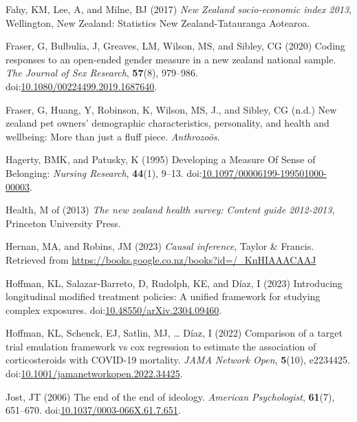 \documentclass[
  singlecolumn,
  9pt]{article}
\newlength{\cslhangindent}
\newenvironment{CSLReferences}[2] %
 {\begin{list}{}{%
  \setlength{\itemindent}{0pt}
  \setlength{\leftmargin}{0pt}
  \setlength{\parsep}{0pt}
  \ifodd #1
   \setlength{\leftmargin}{\cslhangindent}
   \setlength{\itemindent}{-1\cslhangindent}
  \fi
  \setlength{\itemsep}{#2\baselineskip}}}
 {\end{list}}
\begin{document}
\begin{CSLReferences}{1}{0}
Fahy, KM, Lee, A, and Milne, BJ (2017) \emph{New Zealand socio-economic
index 2013}, Wellington, New Zealand: Statistics New Zealand-Tatauranga
Aotearoa.

Fraser, G, Bulbulia, J, Greaves, LM, Wilson, MS, and Sibley, CG (2020)
Coding responses to an open-ended gender measure in a new zealand
national sample. \emph{The Journal of Sex Research}, \textbf{57}(8),
979--986.
doi:\href{https://doi.org/10.1080/00224499.2019.1687640}{10.1080/00224499.2019.1687640}.

Fraser, G, Huang, Y, Robinson, K, Wilson, MS, J., and Sibley, CG (n.d.)
New zealand pet owners{'} demographic characteristics, personality, and
health and wellbeing: More than just a fluff piece. \emph{Anthrozoös}.

Hagerty, BMK, and Patusky, K (1995) Developing a Measure Of Sense of
Belonging: \emph{Nursing Research}, \textbf{44}(1), 9--13.
doi:\href{https://doi.org/10.1097/00006199-199501000-00003}{10.1097/00006199-199501000-00003}.

Health, M of (2013) \emph{The new zealand health survey: Content guide
2012-2013}, Princeton University Press.

Hernan, MA, and Robins, JM (2023) \emph{Causal inference}, Taylor \&
Francis. Retrieved from
\url{https://books.google.co.nz/books?id=/_KnHIAAACAAJ}

Hoffman, KL, Salazar-Barreto, D, Rudolph, KE, and Díaz, I (2023)
Introducing longitudinal modified treatment policies: A unified
framework for studying complex exposures.
doi:\href{https://doi.org/10.48550/arXiv.2304.09460}{10.48550/arXiv.2304.09460}.

Hoffman, KL, Schenck, EJ, Satlin, MJ, \ldots{} Díaz, I (2022) Comparison
of a target trial emulation framework vs cox regression to estimate the
association of corticosteroids with COVID-19 mortality. \emph{JAMA
Network Open}, \textbf{5}(10), e2234425.
doi:\href{https://doi.org/10.1001/jamanetworkopen.2022.34425}{10.1001/jamanetworkopen.2022.34425}.

Jost, JT (2006) The end of the end of ideology. \emph{American
Psychologist}, \textbf{61}(7), 651--670.
doi:\href{https://doi.org/10.1037/0003-066X.61.7.651}{10.1037/0003-066X.61.7.651}.


\end{CSLReferences}
\end{document}
